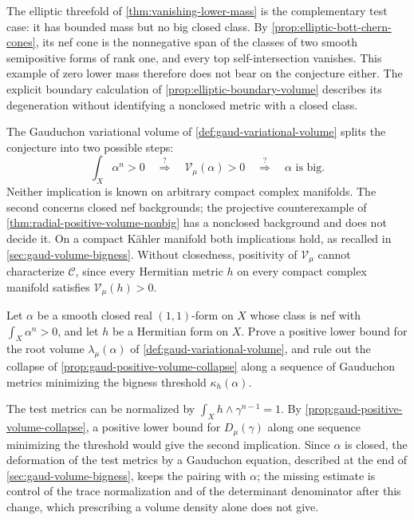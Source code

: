 The elliptic threefold of \cref{thm:vanishing-lower-mass} is the complementary test case: it has bounded mass but no big closed class. By \cref{prop:elliptic-bott-chern-cones}, its nef cone is the nonnegative span of the classes of two smooth semipositive forms of rank one, and every top self-intersection vanishes. This example of zero lower mass therefore does not bear on the conjecture either. The explicit boundary calculation of \cref{prop:elliptic-boundary-volume} describes its degeneration without identifying a nonclosed metric with a closed class.

The Gauduchon variational volume of \cref{def:gaud-variational-volume} splits the conjecture into two possible steps:
\begin{equation}\label{eq:dp-two-bridges}
 \int_X\alpha^n>0
 \quad\stackrel{?}{\Longrightarrow}\quad
 \mathcal V_\mu(\alpha)>0
 \quad\stackrel{?}{\Longrightarrow}\quad
 \alpha\text{ is big}.
\end{equation}
Neither implication is known on arbitrary compact complex manifolds. The second concerns closed nef backgrounds; the projective counterexample of \cref{thm:radial-positive-volume-nonbig} has a nonclosed background and does not decide it. On a compact K\"ahler manifold both implications hold, as recalled in \cref{sec:gaud-volume-bigness}. Without closedness, positivity of $\mathcal V_\mu$ cannot characterize $\mathcal C$, since every Hermitian metric $h$ on every compact complex manifold satisfies $\mathcal V_\mu(h)>0$.

\begin{problem}\label{qu:closed-nef-gaud-bridge}
Let $\alpha$ be a smooth closed real $(1,1)$-form on $X$ whose class is nef with $\int_X\alpha^n>0$, and let $h$ be a Hermitian form on $X$. Prove a positive lower bound for the root volume $\lambda_\mu(\alpha)$ of \cref{def:gaud-variational-volume}, and rule out the collapse of \cref{prop:gaud-positive-volume-collapse} along a sequence of Gauduchon metrics minimizing the bigness threshold $\kappa_h(\alpha)$.
\end{problem}

The test metrics can be normalized by $\int_Xh\wedge\gamma^{n-1}=1$. By \cref{prop:gaud-positive-volume-collapse}, a positive lower bound for $D_\mu(\gamma)$ along one sequence minimizing the threshold would give the second implication. Since $\alpha$ is closed, the deformation of the test metrics by a Gauduchon equation, described at the end of \cref{sec:gaud-volume-bigness}, keeps the pairing with $\alpha$; the missing estimate is control of the trace normalization and of the determinant denominator after this change, which prescribing a volume density alone does not give.

